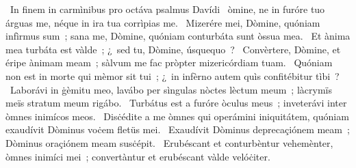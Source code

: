 {~In finem in carmìnibus pro octáva psalmus Davídi}
{%
~òmine, ne in furóre tuo árguas me, néque in ira tua corrìpias me.
~Mizerére mei, Dòmine, quóniam infìrmus sum~; sana me, Dòmine, quóniam conturbáta sunt òssua mea.
~Et ànima mea turbáta est vàlde~; ¿~sed tu, Dòmine, úsquequo~?
~Convèrtere, Dòmine, et éripe ànimam meam~; sàlvum me fac pròpter mizericórdiam tuam.
~Quóniam non est in morte qui mèmor sit tui~; ¿~in infèrno autem quìs confitébitur tìbi~?
~Laborávi in ġèmitu meo, lavábo per sìngulas nòctes lèctum meum~; làcrymïs meïs stratum meum rigábo.
~Turbátus est a furóre òculus meus~; inveterávi inter òmnes inimícos meos.
~Disċédite a me òmnes qui operámini iniquitátem, quóniam exaudívit Dòminus voċem fletüs mei.
~Exaudívit Dòminus deprecaçiónem meam~; Dòminus oraçiónem meam susċépit.
~Erubéscant et conturbèntur vehemènter, òmnes inimíci mei~; convertàntur et erubéscant vàlde velóċiter.
}

